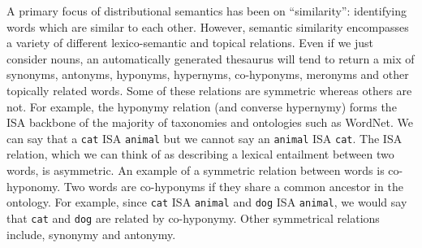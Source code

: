\documentclass[11pt]{article}
\begin{document}
A primary focus of distributional semantics has been on ``similarity'': identifying words which are similar to each other. However, semantic similarity encompasses a variety of different lexico-semantic and topical relations.  Even if we just consider nouns, an automatically generated thesaurus will tend to return a mix of synonyms, antonyms, hyponyms, hypernyms, co-hyponyms, meronyms and other topically related words.  Some of these relations are symmetric whereas others are not.  For example, the hyponymy relation (and converse hypernymy) forms the ISA backbone of the majority of taxonomies and ontologies such as WordNet.  We can say that a \texttt{cat} ISA \texttt{animal}  but we cannot say an \texttt{animal} ISA \texttt{cat}.  The ISA relation, which we can think of  as describing a lexical entailment \cite{Geffet2005}  between two words, is asymmetric. An example of a symmetric relation between words is co-hyponomy. Two words are co-hyponyms if they share a common ancestor in the ontology. 
For example, since \texttt{cat} ISA \texttt{animal} and \texttt{dog} ISA \texttt{animal}, we would say that \texttt{cat} and \texttt{dog} are related by co-hyponymy.  Other symmetrical relations include, synonymy and antonymy. 
\end{document}
